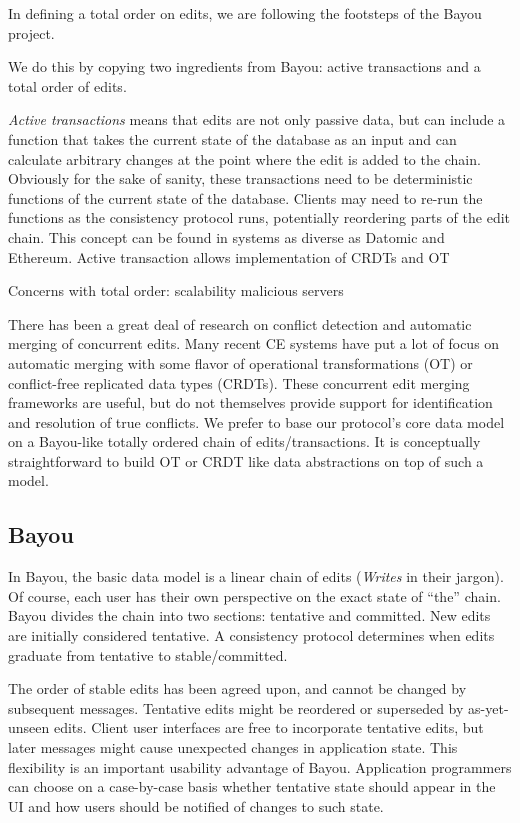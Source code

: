 \documentclass[runningheads]{llncs}
\begin{document}
In defining a total order on edits, we are following the footsteps of the Bayou project.


We do this by copying two ingredients from Bayou: active transactions and a total order of edits.

\emph{Active transactions} means that edits are not only passive data, but can include a function that takes the current state of the database as an input and can calculate arbitrary changes at the point where the edit is added to the chain.
Obviously for the sake of sanity, these transactions need to be deterministic functions of the current state of the database.
Clients may need to re-run the functions as the consistency protocol runs, potentially reordering parts of the edit chain.
This concept can be found in systems as diverse as Datomic and Ethereum.
Active transaction allows implementation of CRDTs and OT

Concerns with total order:
scalability
malicious servers

There has been a great deal of research on conflict detection and automatic merging of concurrent edits.
Many recent CE systems have put a lot of focus on automatic merging with some flavor of operational transformations (OT) or conflict-free replicated data types (CRDTs).
These concurrent edit merging frameworks are useful, but do not themselves provide support for identification and resolution of true conflicts.
We prefer to base our protocol's core data model on a Bayou-like totally ordered chain of edits{\slash}transactions.
It is conceptually straightforward to build OT or CRDT like data abstractions on top of such a model.

\subsection{Bayou}

In Bayou, the basic data model is a linear chain of edits (\emph{Writes} in their jargon).
Of course, each user has their own perspective on the exact state of ``the'' chain.
Bayou divides the chain into two sections: tentative and committed.
New edits are initially considered tentative.
A consistency protocol determines when edits graduate from tentative to stable{\slash}committed.

The order of stable edits has been agreed upon, and cannot be changed by subsequent messages.
Tentative edits might be reordered or superseded by as-yet-unseen edits.
Client user interfaces are free to incorporate tentative edits, but later messages might cause unexpected changes in application state.
This flexibility is an important usability advantage of Bayou.
Application programmers can choose on a case-by-case basis whether tentative state should appear in the UI and how users should be notified of changes to such state.
\end{document}
